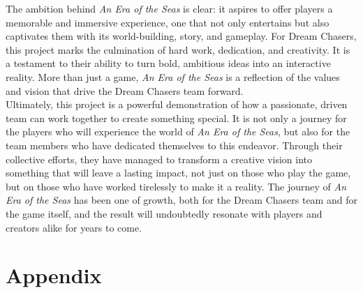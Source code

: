 \documentclass{article}
\begin{document}
The ambition behind \textit{An Era of the Seas} is clear: it aspires to offer players a memorable and immersive experience, one that not only entertains but also captivates them with its world-building, story, and gameplay. For Dream Chasers, this project marks the culmination of hard work, dedication, and creativity. It is a testament to their ability to turn bold, ambitious ideas into an interactive reality. More than just a game, \textit{An Era of the Seas} is a reflection of the values and vision that drive the Dream Chasers team forward.\\

Ultimately, this project is a powerful demonstration of how a passionate, driven team can work together to create something special. It is not only a journey for the players who will experience the world of \textit{An Era of the Seas}, but also for the team members who have dedicated themselves to this endeavor. Through their collective efforts, they have managed to transform a creative vision into something that will leave a lasting impact, not just on those who play the game, but on those who have worked tirelessly to make it a reality. The journey of \textit{An Era of the Seas} has been one of growth, both for the Dream Chasers team and for the game itself, and the result will undoubtedly resonate with players and creators alike for years to come.















\newpage
\section*{Appendix}
\end{document}
